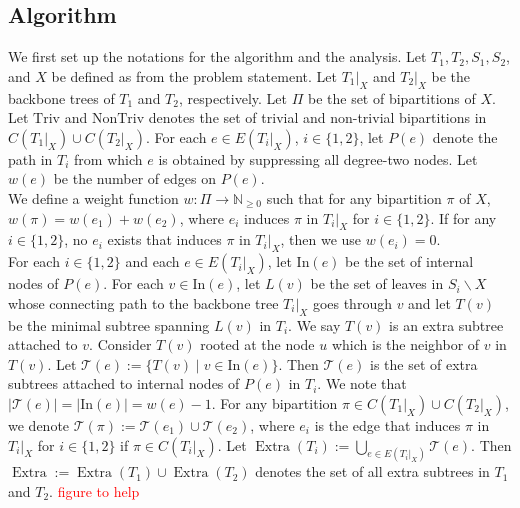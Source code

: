 \documentclass{article}
\newcommand{\note}[1]{\textcolor{red}{#1}}
\newcommand{\In}{\mathrm{In}}
\newcommand{\triv}{\mathrm{Triv}}
\newcommand{\ntriv}{\mathrm{NonTriv}}
\DeclareMathOperator*{\extra}{Extra}
\begin{document}
\subsection{Algorithm}

We first set up the notations for the algorithm and the analysis. Let $T_1,T_2,S_1,S_2$, and $X$ be defined as from the problem statement. Let $T_1|_X$ and $T_2|_X$ be the backbone trees of $T_1$ and $T_2$, respectively. Let $\Pi$ be the set of bipartitions of $X$. Let $\triv$ and $\ntriv$ denotes the set of trivial and non-trivial bipartitions in $C(T_1|_X) \cup C(T_2|_X)$. For each $e \in E(T_i|_X)$, $i \in \{1,2\}$, let $P(e)$ denote the path in $T_i$ from which $e$ is obtained by suppressing all degree-two nodes. Let $w(e)$ be the number of edges on $P(e)$. \\

We define a weight function $w:\Pi \to \mathbb{N}_{\ge 0}$ such that for any bipartition $\pi$ of $X$, $w(\pi) = w(e_1) + w(e_2)$, where $e_i$ induces $\pi$ in $T_i|_X$ for $i \in \{1,2\}$. If for any $i \in \{1,2\}$, no $e_i$ exists that induces $\pi$ in $T_i|_X$, then we use $w(e_i) = 0$.\\

For each $i \in \{1,2\}$ and each $e \in E(T_i|_X)$, let $\In(e)$ be the set of internal nodes of $P(e)$. For each $v \in \In(e)$, let $L(v)$ be the set of leaves in $S_i \backslash X$ whose connecting path to the backbone tree $T_i|_X$ goes through $v$ and let $T(v)$ be the minimal subtree spanning $L(v)$ in $T_i$. We say $T(v)$ is an extra subtree attached to $v$. Consider $T(v)$ rooted at the node $u$ which is the neighbor of $v$ in $T(v)$. Let $\mathcal{T}(e) := \{T(v) \mid v \in \In(e)\}$. Then $\mathcal{T}(e)$ is the set of extra subtrees attached to internal nodes of $P(e)$ in $T_i$. We note that $|\mathcal{T}(e)| = |\In(e)| = w(e)-1$. For any bipartition $\pi \in C(T_1|_X) \cup C(T_2|_X)$, we denote $\mathcal{T}(\pi) := \mathcal{T}(e_1) \cup \mathcal{T}(e_2)$, where $e_i$ is the edge that induces $\pi$ in $T_i|_X$ for $i \in \{1,2\}$ if $\pi \in C(T_i|_X)$. Let $\extra(T_i) := \bigcup_{e \in E(T_i|_X)} \mathcal{T}(e)$. Then $\extra := \extra(T_1) \cup \extra(T_2)$ denotes the set of all extra subtrees in $T_1$ and $T_2$. \note{figure to help}
\end{document}
